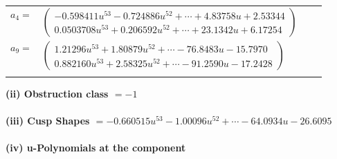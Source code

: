 \documentclass[1p]{elsarticle_modified}
\theoremstyle{definition}
\begin{document}
\begin{tabular}{m{7pt} m{180pt} m{7pt} m{180pt} }
\flushright $a_{4}=$&$\begin{pmatrix}-0.598411 u^{53}-0.724886 u^{52}+\cdots+4.83758 u+2.53344\\0.0503708 u^{53}+0.206592 u^{52}+\cdots+23.1342 u+6.17254\end{pmatrix}$ \\
\flushright $a_{9}=$&$\begin{pmatrix}1.21296 u^{53}+1.80879 u^{52}+\cdots-76.8483 u-15.7970\\0.882160 u^{53}+2.58325 u^{52}+\cdots-91.2590 u-17.2428\end{pmatrix}$\\&\end{tabular}
\flushleft \textbf{(ii) Obstruction class $= -1$}\\~\\
\flushleft \textbf{(iii) Cusp Shapes $= -0.660515 u^{53}-1.00096 u^{52}+\cdots-64.0934 u-26.6095$}\\~\\
\newpage\renewcommand{\arraystretch}{1}
\flushleft \textbf{(iv) u-Polynomials at the component}\newline \\
\end{document}
